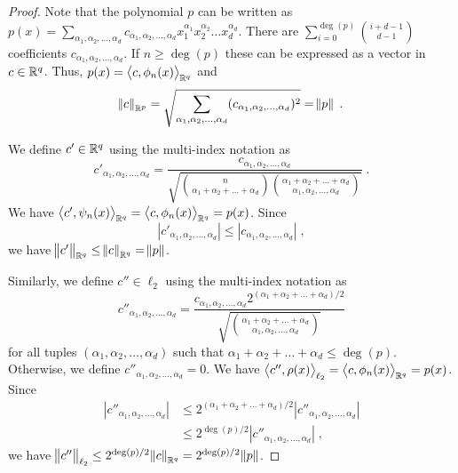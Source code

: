 \begin{proof}
Note that the polynomial $p$ can be written as
$p(x) = \sum_{\alpha_1, \alpha_2, \dots, \alpha_d} c_{\alpha_1, \alpha_2, \dots, \alpha_d} x_1^{\alpha_1} x_2^{\alpha_2} \dots x_d^{\alpha_d}$.
There are $\sum_{i=0}^{\deg(p)} \binom{i+d-1}{d-1}$ coefficients $c_{\alpha_1, \alpha_2, \dots, \alpha_d}$.
If $n \ge \deg(p)$ these can be expressed as a vector in $c \in \mathbb{R}^q$. Thus, $p(x) = \left\langle c, \phi_n(x) \right\rangle_{\mathbb{R}^q}$
and
$$
\norm{c}_{\mathbb{R}^p} = \sqrt{\sum_{\alpha_1, \alpha_2, \dots, \alpha_d} (c_{\alpha_1, \alpha_2, \dots, \alpha_d})^2} =  \norm{p} \; .
$$

We define $c' \in \mathbb{R}^q$ using the multi-index notation as
$$
c'_{\alpha_1, \alpha_2, \dots, \alpha_d}
= \frac{c_{\alpha_1, \alpha_2, \dots, \alpha_d}}{\sqrt{\binom{n}{\alpha_1 + \alpha_2 + \dots + \alpha_d} \binom{\alpha_1 + \alpha_2 + \dots + \alpha_d}{\alpha_1, \alpha_2, \dots, \alpha_d}}} \; .
$$
We have $\left\langle c', \psi_n(x) \right\rangle_{\mathbb{R}^q} = \left\langle c, \phi_n(x) \right\rangle_{\mathbb{R}^q} = p(x)$. Since
$$
|c'_{\alpha_1, \alpha_2, \dots, \alpha_d}| \le |c_{\alpha_1, \alpha_2, \dots, \alpha_d}| \; ,
$$
we have $\norm{c'}_{\mathbb{R}^q} \le \norm{c}_{\mathbb{R}^q} = \norm{p}$.

Similarly, we define $c'' \in \ell_2$ using the multi-index notation as
$$
c''_{\alpha_1, \alpha_2, \dots, \alpha_d}
= \frac{c_{\alpha_1, \alpha_2, \dots, \alpha_d} 2^{(\alpha_1 + \alpha_2 + \dots + \alpha_d)/2}}{\sqrt{\binom{\alpha_1 + \alpha_2 + \dots + \alpha_d}{\alpha_1, \alpha_2, \dots, \alpha_d}}}
$$
for all tuples $(\alpha_1, \alpha_2, \dots, \alpha_d)$ such that $\alpha_1 + \alpha_2 + \dots + \alpha_d \le \deg(p)$.
Otherwise, we define $c''_{\alpha_1, \alpha_2, \dots, \alpha_d} = 0$. We have
$\left\langle c'', \rho(x) \right\rangle_{\ell_2} = \left\langle c, \phi_n(x) \right\rangle_{\mathbb{R}^q} = p(x)$. Since
\begin{align*}
|c''_{\alpha_1, \alpha_2, \dots, \alpha_d}|
& \le 2^{(\alpha_1 + \alpha_2 + \dots + \alpha_d)/2} |c''_{\alpha_1, \alpha_2, \dots, \alpha_d}| \\
& \le 2^{\deg(p)/2} |c''_{\alpha_1, \alpha_2, \dots, \alpha_d}| \; ,
\end{align*}
we have $\norm{c''}_{\ell_2} \le 2^{\deg(p)/2} \norm{c}_{\mathbb{R}^q} = 2^{\deg(p)/2} \norm{p}$.
\end{proof}

